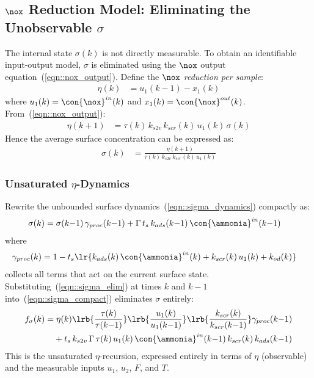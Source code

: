 \subsection{$\nox$ Reduction Model: Eliminating the Unobservable $\sigma$ \label{sec::nox_io_model}}

The internal state $\sigma(k)$ is not directly measurable. To obtain an identifiable input-output model, $\sigma$ is
eliminated using the $\nox$ output equation~(\ref{eqn::nox_output}). Define the \textit{$\nox$ reduction per sample}:
\begin{align}
    \eta(k) &= u_1(k{-}1) - x_1(k)
    \label{eqn::eta_def}
\end{align}
where $u_1(k) = \con{\nox}^{in}(k)$ and $x_1(k) = \con{\nox}^{out}(k)$. From~(\ref{eqn::nox_output}):
\begin{align}
    \eta(k{+}1) &= \tau(k)\, k_{s2v}\, k_{scr}(k)\, u_1(k)\, \sigma(k)
\end{align}
Hence the average surface concentration can be expressed as:
\begin{align}
    \sigma(k) &= \frac{\eta(k{+}1)}{\tau(k)\, k_{s2v}\, k_{scr}(k)\, u_1(k)}
    \label{eqn::sigma_elim}
\end{align}

\subsubsection{Unsaturated $\eta$-Dynamics}
Rewrite the unbounded surface dynamics~(\ref{eqn::sigma_dynamics}) compactly as:
\begin{align}
    \sigma(k) &= \sigma(k{-}1)\,\gamma_{proc}(k{-}1) + \Gamma\, t_s\, k_{ads}(k{-}1)\, \con{\ammonia}^{in}(k{-}1)
    \label{eqn::sigma_compact}
\end{align}
where
\begin{align}
    \gamma_{proc}(k) &= 1 - t_s\lr{k_{ads}(k)\,\con{\ammonia}^{in}(k) + k_{scr}(k)\,u_1(k) + k_{od}(k)}
    \label{eqn::gamma_proc}
\end{align}
collects all terms that act on the current surface state. Substituting~(\ref{eqn::sigma_elim}) at times $k$ and
$k{-}1$ into~(\ref{eqn::sigma_compact}) eliminates $\sigma$ entirely:
\begin{align}
    f_\sigma(k) =& \;\eta(k) \lrb{\frac{\tau(k)}{\tau(k{-}1)}}
                            \lrb{\frac{u_1(k)}{u_1(k{-}1)}}
                            \lrb{\frac{k_{scr}(k)}{k_{scr}(k{-}1)}}
                            \gamma_{proc}(k{-}1) \notag \\
        &+ t_s\, k_{s2v}\, \Gamma\, \tau(k)\, u_1(k)\, \con{\ammonia}^{in}(k{-}1)\,
            k_{scr}(k)\, k_{ads}(k{-}1)
    \label{eqn::f_sigma}
\end{align}
This is the unsaturated $\eta$-recursion, expressed entirely in terms of $\eta$ (observable) and the measurable inputs
$u_1$, $u_2$, $F$, and $T$.

